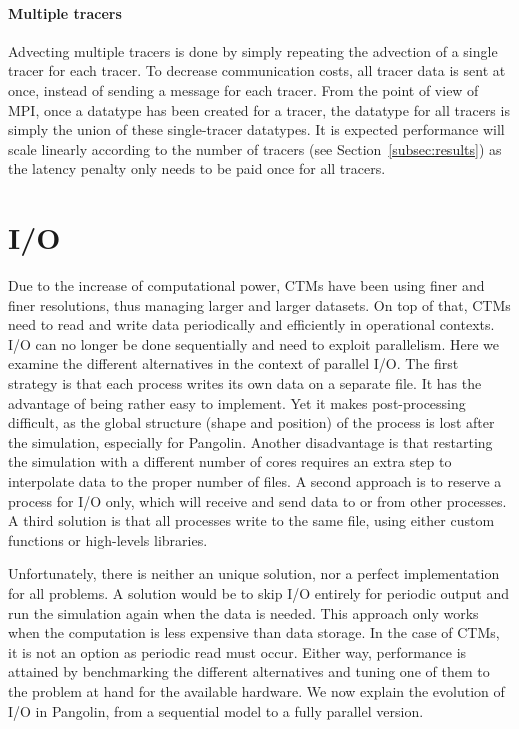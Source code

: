 \paragraph{Multiple tracers}
Advecting multiple tracers is done by simply repeating the advection of a single
tracer for each tracer. To decrease communication costs, all tracer data is sent at once, instead of sending a message for each tracer. From the
point of view of MPI, once a datatype has been created for a tracer, the
datatype for all tracers is simply the union of these single-tracer datatypes.
It is expected performance will scale linearly according to the number of tracers (see
Section~\ref{subsec:results}) as the latency penalty only needs to be paid once
for all tracers.

\section{I/O}
Due to the increase of computational power, CTMs have been using finer and finer
resolutions, thus managing larger and larger datasets. On top of that, CTMs need
to read and write data periodically and efficiently in operational contexts. I/O
can no longer be done sequentially and need to exploit parallelism. Here we
examine the different alternatives in the context of parallel I/O.  The first
strategy is that each process writes its own data on a separate file. It has the
advantage of being rather easy to implement. Yet it makes post-processing
difficult, as the global structure (shape and position) of the process is lost
after the simulation, especially for Pangolin. Another disadvantage is that
restarting the simulation with a different number of cores requires an extra step
to interpolate data to the proper number of files. A second approach is to
reserve a process for I/O only, which will receive and send data to or from
other processes. A third solution is that all processes write to the same file,
using either custom functions or high-levels libraries. 

Unfortunately, there is neither an unique solution, nor a perfect implementation
for all problems. A solution would be to skip I/O entirely for periodic output
and run the simulation again when the data is needed. This approach only works
when the computation is less expensive than data storage. In the case of CTMs,
it is not an option as periodic read must occur. Either way, performance is
attained by benchmarking the different alternatives and tuning one of them to
the problem at hand for the available hardware. We now explain the evolution of
I/O in Pangolin, from a sequential model to a fully parallel version.


